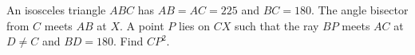 An isosceles triangle $ABC$ has $AB=AC=225$ and $BC=180$. The angle bisector from $C$ meets $AB$ at $X$. A point $P$ lies on $CX$ such that the ray $BP$ meets $AC$ at $D\ne C$ and $BD=180$. Find $CP^2$.
